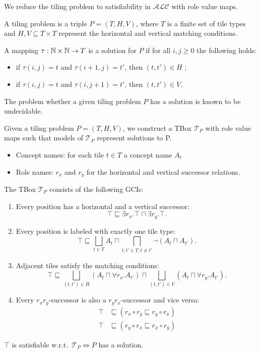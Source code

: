 We reduce the tiling problem to satisfiability in $\mathcal{ALC}$ with role value maps.
\begin{definition}
	A tiling problem is a triple $P= (T, H, V)$, where $T$ is a finite set of tile types
	and $H, V \subseteq T \times T$ represent the horizontal and vertical matching conditions.

	A mapping $\tau: \mathbb{N} \times \mathbb{N} \to T$ is a solution for $P$ if for all $i, j \geq 0$ the following holds:
	\begin{itemize}
		\item if $\tau(i,j) = t$ and $\tau(i+1,j) = t'$, then $(t,t') \in H$ ;
		\item if $\tau(i,j) = t$ and $\tau(i,j+1) = t'$, then $(t,t') \in V$.
	\end{itemize}

	The problem whether a given tiling problem $P$ has a solution is known to be undecidable.
\end{definition}
Given a tiling problem $P = (T, H, V)$, we construct a TBox $\mathcal{T}_P$ with role value maps
such that models of $\mathcal{T}_P$ represent solutions to P.
\begin{itemize}
	\item Concept names: for each tile $t \in T$ a concept name $A_t$ 
	\item Role names: $r_x$ and $r_y$ for the horizontal and vertical successor relations.
\end{itemize}
The TBox $\mathcal{T}_P$ consists of the following GCIs:
\begin{enumerate}[label=(\roman*)]
	\item Every position has a horizontal and a vertical successor:
		\[
			\top \sqsubseteq  \exists r_x .\top \sqcap \exists r_y. \top
		.\]
	\item Every position is labeled with exactly one tile type:
		\[
			\top \sqsubseteq \bigsqcup_{t \in T} A_t \sqcap \bigsqcap_{t,t' \in T, t \neq t'} \neg (A_t \sqcap A_{t'})
		.\]
	\item Adjacent tiles satisfy the matching conditions:
		\[
			\top \sqsubseteq \bigsqcup_{(t,t') \in H} (A_t \sqcap \forall r_x.A_{t'}) \sqcap \bigsqcup_{(t,t') \in V} (A_t \sqcap \forall r_y.A_{t'})
		.\]
	\item Every $r_x r_y$-successor is also a $r_y r_x$-successor and vice versa:
		\begin{align*}
			\top &\sqsubseteq (r_x \circ r_y \sqsubseteq r_y \circ r_x) \\
			\top &\sqsubseteq (r_y \circ r_x \sqsubseteq r_x \circ r_y)
		\end{align*}
\end{enumerate}

\begin{lemma}
	$\top$ is satisfiable w.r.t.\ $\mathcal{T}_P \iff P$  has a solution.
\end{lemma}
